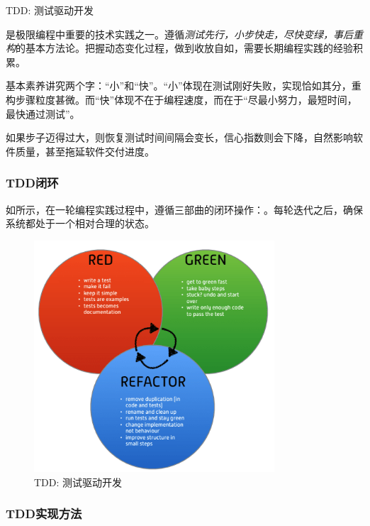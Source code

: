 \begin{content}
\begin{episode}{TDD: 测试驱动开发}

\begin{content}

是极限编程中重要的技术实践之一。遵循\emph{测试先行，小步快走，尽快变绿，事后重构}的基本方法论。把握动态变化过程，做到收放自如，需要长期编程实践的经验积累。

基本素养讲究两个字：“小”和“快”。“小”体现在测试刚好失败，实现恰如其分，重构步骤粒度甚微。而“快”体现不在于编程速度，而在于“尽最小努力，最短时间，最快通过测试”。

如果步子迈得过大，则恢复测试时间间隔会变长，信心指数则会下降，自然影响软件质量，甚至拖延软件交付进度。

\subsubsection{TDD闭环}

如所示，在一轮编程实践过程中，遵循三部曲的闭环操作：。每轮迭代之后，确保系统都处于一个相对合理的状态。

\begin{figure}[H]
\centering
\includegraphics[width=0.8\textwidth]{figures/xunit/tdd-cycle.png}
\caption{TDD: 测试驱动开发}
 \label{fig:tdd-cycle}
\end{figure}

\subsubsection{TDD实现方法}


\end{content}
\end{episode}
\end{content}

